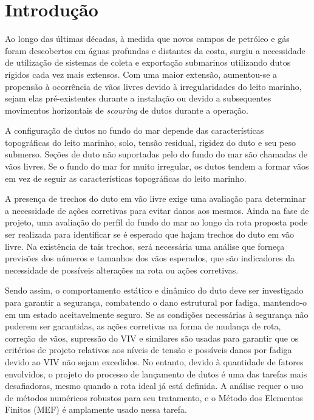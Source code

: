 \chapter{Introdução}


Ao longo das últimas décadas, à medida que novos campos de petróleo e gás foram descobertos em águas profundas e distantes da costa, surgiu a necessidade de utilização de sistemas de coleta e exportação submarinos utilizando dutos rígidos cada vez mais extensos.
Com uma maior extensão, aumentou-se a propensão à ocorrência de vãos livres devido à irregularidades do leito marinho, sejam elas pré-existentes durante a instalação ou devido a subsequentes movimentos horizontais de \textit{scouring} de dutos durante a operação.

A configuração de dutos no fundo do mar depende das características topográficas do leito marinho, solo, tensão residual, rigidez do duto e seu peso submerso.
Seções de duto não suportadas pelo do fundo do mar são chamadas de vãos livres.
Se o fundo do mar for muito irregular, os dutos tendem a formar vãos em vez de seguir as características topográficas do leito marinho.

A presença de trechos do duto em vão livre exige uma avaliação para determinar a necessidade de ações corretivas para evitar danos aos mesmos. Ainda na fase de projeto, uma avaliação do perfil do fundo do mar ao longo da rota proposta pode ser realizada para identificar se é esperado que hajam trechos do duto em vão livre.
Na existência de tais trechos, será necessária uma análise que forneça previsões dos números e tamanhos dos vãos esperados, que são indicadores da necessidade de possíveis alterações na rota ou ações corretivas.

Sendo assim, o comportamento estático e dinâmico do duto deve ser investigado para garantir a segurança, combatendo o dano estrutural por fadiga, mantendo-o em um estado aceitavelmente seguro.
Se as condições necessárias à segurança não puderem ser garantidas, as ações corretivas na forma de mudança de rota, correção de vãos, supressão do VIV e similares são usadas para garantir que os critérios de projeto relativos aos níveis de tensão e possíveis danos por fadiga devido ao VIV não sejam excedidos.
No entanto, devido à quantidade de fatores envolvidos, o projeto do processo de lançamento de dutos é uma das tarefas mais desafiadoras, mesmo quando a rota ideal já está definida.
A análise requer o uso de métodos numéricos robustos para seu tratamento, e o Método dos Elementos Finitos (MEF) é amplamente usado nessa tarefa.

